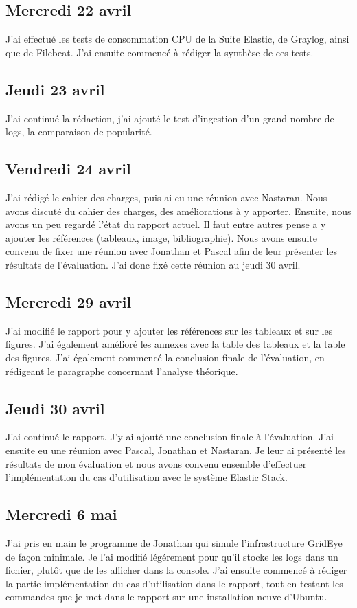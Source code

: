 \documentclass[paper=a4, fontsize=11pt]{scrartcl}
\begin{document}
\subsection{Mercredi 22 avril}
    J'ai effectué les tests de consommation CPU de la Suite Elastic, de Graylog, ainsi que de Filebeat. J'ai ensuite commencé à rédiger la synthèse de ces tests.
\subsection{Jeudi 23 avril}
    J'ai continué la rédaction, j'ai ajouté le test d'ingestion d'un grand nombre de logs, la comparaison de popularité.
\subsection{Vendredi 24 avril}
    J'ai rédigé le cahier des charges, puis ai eu une réunion avec Nastaran. Nous avons discuté du cahier des charges, des améliorations à y apporter. Ensuite, nous avons un peu regardé l'état du rapport actuel. Il faut entre autres pense a y ajouter les références (tableaux, image, bibliographie). Nous avons ensuite convenu de fixer une réunion avec Jonathan et Pascal afin de leur présenter les résultats de l'évaluation. J'ai donc fixé cette réunion au jeudi 30 avril.
\subsection{Mercredi 29 avril}
    J'ai modifié le rapport pour y ajouter les références sur les tableaux et sur les figures. J'ai également amélioré les annexes avec la table des tableaux et la table des figures. J'ai également commencé la conclusion finale de l'évaluation, en rédigeant le paragraphe concernant l'analyse théorique.
\subsection{Jeudi 30 avril}
    J'ai continué le rapport. J'y ai ajouté une conclusion finale à l'évaluation. J'ai ensuite eu une réunion avec Pascal, Jonathan et Nastaran. Je leur ai présenté les résultats de mon évaluation et nous avons convenu ensemble d'effectuer l'implémentation du cas d'utilisation avec le système Elastic Stack.
\subsection{Mercredi 6 mai}
    J'ai pris en main le programme de Jonathan qui simule l'infrastructure GridEye de façon minimale. Je l'ai modifié légérement pour qu'il stocke les logs dans un fichier, plutôt que de les afficher dans la console. J'ai ensuite commencé à rédiger la partie implémentation du cas d'utilisation dans le rapport, tout en testant les commandes que je met dans le rapport sur une installation neuve d'Ubuntu.
\end{document}
